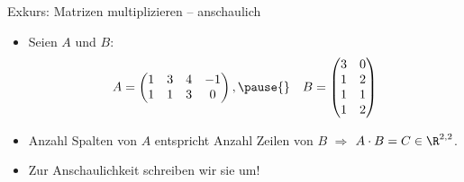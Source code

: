 \def\fakepad#1{\raisebox{-0.75em}[0pt][0pt]{#1}}
\begin{frame}[t,fragile]{Exkurs: Matrizen multiplizieren -- anschaulich}
    \begin{itemize}[<+(1)->]
        \item Seien \(A\) und \(B\):\pause{}
        \[A = \begin{pmatrix}
            1 & 3 & 4 & -1\\
            1 & 1 & 3 & 0\\
        \end{pmatrix},\pause{}\quad B = \begin{pmatrix}
            3 & 0 \\
            1 & 2 \\
            1 & 1 \\
            1 & 2
        \end{pmatrix}\]
        \item Anzahl Spalten von \(A\) entspricht Anzahl Zeilen von \(B\)\pause{} \(\Rightarrow\) \(A \cdot B = C \in \R^{2, 2}\).
        \item Zur Anschaulichkeit schreiben wir sie um!
    \end{itemize}
\end{frame}


